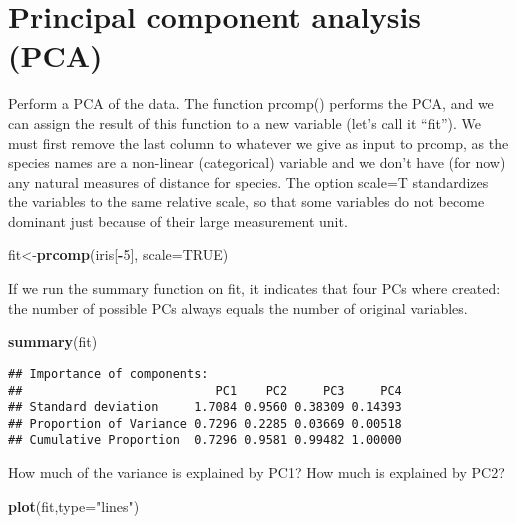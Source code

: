 \documentclass[
]{book}
\newenvironment{Shaded}{\begin{snugshade}}{\end{snugshade}}
\newcommand{\DataTypeTok}[1]{\textcolor[rgb]{0.13,0.29,0.53}{#1}}
\newcommand{\DecValTok}[1]{\textcolor[rgb]{0.00,0.00,0.81}{#1}}
\newcommand{\KeywordTok}[1]{\textcolor[rgb]{0.13,0.29,0.53}{\textbf{#1}}}
\newcommand{\NormalTok}[1]{#1}
\newcommand{\OperatorTok}[1]{\textcolor[rgb]{0.81,0.36,0.00}{\textbf{#1}}}
\newcommand{\OtherTok}[1]{\textcolor[rgb]{0.56,0.35,0.01}{#1}}
\newcommand{\StringTok}[1]{\textcolor[rgb]{0.31,0.60,0.02}{#1}}
\begin{document}
\hypertarget{principal-component-analysis-pca}{%
\section{Principal component analysis (PCA)}\label{principal-component-analysis-pca}}

Perform a PCA of the data. The function prcomp() performs the PCA, and we can assign the result of this function to a new variable (let's call it ``fit''). We must first remove the last column to whatever we give as input to prcomp, as the species names are a non-linear (categorical) variable and we don't have (for now) any natural measures of distance for species. The option scale=T standardizes the variables to the same relative scale, so that some variables do not become dominant just because of their large measurement unit.

\begin{Shaded}
\begin{Highlighting}[]
\NormalTok{fit\textless{}{-}}\KeywordTok{prcomp}\NormalTok{(iris[}\OperatorTok{{-}}\DecValTok{5}\NormalTok{], }\DataTypeTok{scale=}\OtherTok{TRUE}\NormalTok{)}
\end{Highlighting}
\end{Shaded}

If we run the summary function on fit, it indicates that four PCs where created: the number
of possible PCs always equals the number of original variables.

\begin{Shaded}
\begin{Highlighting}[]
\KeywordTok{summary}\NormalTok{(fit)}
\end{Highlighting}
\end{Shaded}

\begin{verbatim}
## Importance of components:
##                           PC1    PC2     PC3     PC4
## Standard deviation     1.7084 0.9560 0.38309 0.14393
## Proportion of Variance 0.7296 0.2285 0.03669 0.00518
## Cumulative Proportion  0.7296 0.9581 0.99482 1.00000
\end{verbatim}

How much of the variance is explained by PC1? How much is explained by PC2?

\begin{Shaded}
\begin{Highlighting}[]
\KeywordTok{plot}\NormalTok{(fit,}\DataTypeTok{type=}\StringTok{"lines"}\NormalTok{)}
\end{Highlighting}
\end{Shaded}
\end{document}
